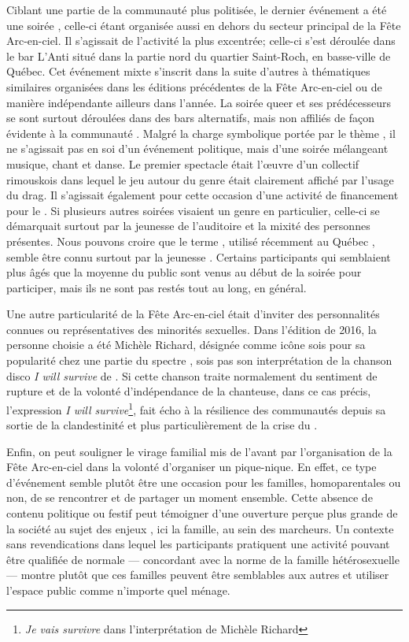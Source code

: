 Ciblant une partie de la communauté plus politisée, le dernier événement a été une soirée \qu{}, celle-ci étant organisée aussi en dehors du secteur principal de la Fête Arc-en-ciel.
Il s'agissait de l'activité la plus excentrée; celle-ci s'est déroulée dans le bar L'Anti situé dans la partie nord du quartier Saint-Roch, en basse-ville de Québec.
Cet événement mixte s'inscrit dans la suite d'autres à thématiques similaires organisées dans les éditions précédentes de la Fête Arc-en-ciel ou de manière indépendante ailleurs dans l'année.
La soirée queer et ses prédécesseurs se sont surtout déroulées dans des bars alternatifs, mais non affiliés de façon évidente à la communauté \lgbt.
Malgré la charge symbolique portée par le thème \qu, il ne s'agissait pas en soi d'un événement politique, mais d'une soirée mélangeant musique, chant et danse.
Le premier spectacle était l'œuvre d'un collectif \qu rimouskois dans lequel le jeu autour du genre était clairement affiché par l'usage du drag.
Il s'agissait également pour cette occasion d'une activité de financement pour le \ggul.
Si plusieurs autres soirées visaient un genre en particulier, celle-ci se démarquait surtout par la jeunesse de l'auditoire et la mixité des personnes présentes.
Nous pouvons croire que le terme \qu, utilisé récemment au Québec , semble être connu surtout par la jeunesse \lgbt.
Certains participants qui semblaient plus âgés que la moyenne du public sont venus au début de la soirée pour participer, mais ils ne sont pas restés tout au long, en général.

Une autre particularité de la Fête Arc-en-ciel était d'inviter des personnalités connues ou représentatives des minorités sexuelles.
Dans l'édition de 2016, la personne choisie a été Michèle Richard, désignée comme icône sois pour sa popularité chez une partie du spectre \lgbt{}, sois pas son interprétation de la chanson disco \emph{I will survive} de .
Si cette chanson traite normalement du sentiment de rupture et de la volonté d'indépendance de la chanteuse, dans ce cas précis, l'expression \emph{I will survive}\footnote{\emph{Je vais survivre} dans l'interprétation de Michèle Richard}, fait écho à la résilience des communautés \lgbt depuis sa sortie de la clandestinité et plus particulièrement de la crise du \vih{}.

Enfin, on peut souligner le virage familial mis de l'avant par l'organisation de la Fête Arc-en-ciel dans la volonté d'organiser un pique-nique.
En effet, ce type d'événement semble plutôt être une occasion pour les familles, homoparentales ou non, de se rencontrer et de partager un moment ensemble.
Cette absence de contenu politique ou festif peut témoigner d'une ouverture perçue plus grande de la société au sujet des enjeux \lgbt, ici la famille, au sein des marcheurs.
Un contexte sans revendications dans lequel les participants pratiquent une activité pouvant être qualifiée de normale --- concordant avec la norme de la famille hétérosexuelle --- montre plutôt que ces familles peuvent être semblables aux autres et utiliser l'espace public comme n'importe quel ménage.


